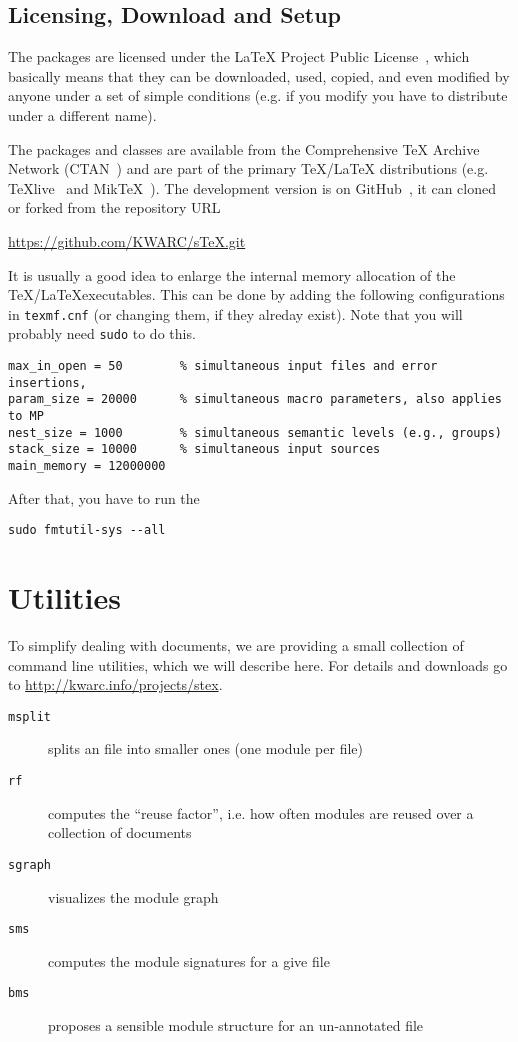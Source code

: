 \documentclass{article}
\begin{document}
\subsection{Licensing, Download and Setup}\label{sec:setup}
 
The {\stex} packages are licensed under the {\LaTeX} Project Public License~\cite{LPPL},
which basically means that they can be downloaded, used, copied, and even modified by
anyone under a set of simple conditions (e.g. if you modify you have to distribute under a
different name). 

The {\stex} packages and classes are available from the Comprehensive {\TeX} Archive
Network (CTAN~\cite{CTAN:on}) and are part of the primary {\TeX/\LaTeX} distributions
(e.g. TeXlive~\cite{TeXLive:on} and MikTeX~\cite{MiKTeX:on}). The development version is
on GitHub~\cite{sTeX:github:on}, it can cloned or forked from the repository URL
\begin{center}
  \url{https://github.com/KWARC/sTeX.git}
\end{center}
It is usually a good idea to enlarge the internal memory allocation of the \TeX/\LaTeX executables. This can be done by
adding the following configurations in \texttt{texmf.cnf} (or changing them, if they
alreday exist). Note that you will probably need \texttt{sudo} to do this. 
\begin{lstlisting}
max_in_open = 50        % simultaneous input files and error insertions, 
param_size = 20000      % simultaneous macro parameters, also applies to MP
nest_size = 1000        % simultaneous semantic levels (e.g., groups)
stack_size = 10000      % simultaneous input sources
main_memory = 12000000
\end{lstlisting}
After that, you have to run the 
\begin{lstlisting}
sudo fmtutil-sys --all
\end{lstlisting}

\section{Utilities}\label{sec:utilities}

To simplify dealing with {\stex} documents, we are providing a small collection of command
line utilities, which we will describe here. For details and downloads go to
{\url{http://kwarc.info/projects/stex}}.

\begin{description}
\item[{\texttt{msplit}}] splits an {\stex} file into smaller ones (one module per file)
\item[{\texttt{rf}}] computes the ``reuse factor'', i.e. how often {\stex} modules are reused
  over a collection of documents 
\item[{\texttt{sgraph}}] visualizes the module graph
\item[{\texttt{sms}}] computes the {\stex} module signatures for a give {\stex} file
\item[{\texttt{bms}}] proposes a sensible module structure for an un-annotated {\stex} file
\end{description}
\printbibliography
\end{document}
